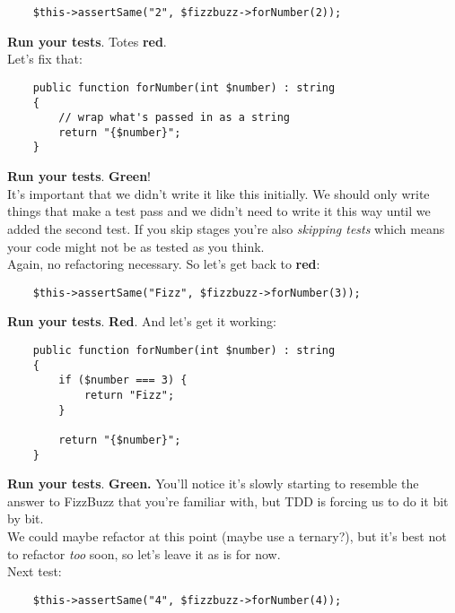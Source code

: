 \begin{verbatim}
    $this->assertSame("2", $fizzbuzz->forNumber(2));
\end{verbatim}

\textbf{Run your tests}. Totes \textbf{red}.
\\

Let's fix that:

\begin{verbatim}
    public function forNumber(int $number) : string
    {
        // wrap what's passed in as a string
        return "{$number}";
    }
\end{verbatim}

\textbf{Run your tests}. \textbf{Green}!
\\

It's important that we didn't write it like this initially. We should only write things that make a test pass and we didn't need to write it this way until we added the second test. If you skip stages you're also \textit{skipping tests} which means your code might not be as tested as you think.
\\

Again, no refactoring necessary. So let's get back to \textbf{red}:

\begin{verbatim}
    $this->assertSame("Fizz", $fizzbuzz->forNumber(3));
\end{verbatim}

\textbf{Run your tests}. \textbf{Red}. And let's get it working:

\begin{verbatim}
    public function forNumber(int $number) : string
    {
        if ($number === 3) {
            return "Fizz";
        }

        return "{$number}";
    }
\end{verbatim}

\textbf{Run your tests}. \textbf{Green.} You'll notice it's slowly starting to resemble the answer to FizzBuzz that you're familiar with, but TDD is forcing us to do it bit by bit.
\\

We could maybe refactor at this point (maybe use a ternary?), but it's best not to refactor \textit{too} soon, so let's leave it as is for now.
\\

Next test:

\begin{verbatim}
    $this->assertSame("4", $fizzbuzz->forNumber(4));
\end{verbatim}

